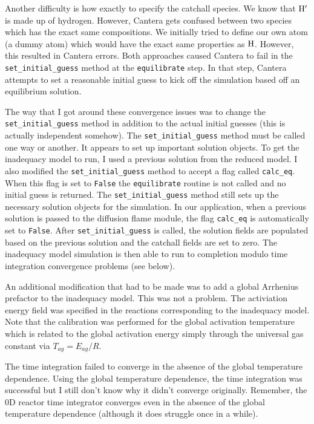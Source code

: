 Another difficulty is how exactly to specify the catchall species.  We know that $\ce{H}^{\prime}$ 
is made up of hydrogen.  However, Cantera gets confused between two species which has the exact 
same compositions.  We initially tried to define our own atom (a dummy atom) which would have
the exact same properties as $\ce{H}$.  However, this resulted in Cantera errors.  Both
approaches caused Cantera to fail in the \texttt{set\_initial\_guess} method at the \texttt{equilibrate} 
step.  In that step, Cantera attempts to set a reasonable initial guess to kick off the simulation 
based off an equilibrium solution. 

The way that I got around these convergence issues was to change the \texttt{set\_initial\_guess} 
method in addition to the actual initial guesses (this is actually independent somehow).  
The \texttt{set\_initial\_guess} method must be called one way or another.  It appears to 
set up important solution objects.  To get the inadequacy model to run, I used a previous 
solution from the reduced model.  I also modified the \texttt{set\_initial\_guess} method 
to accept a flag called \texttt{calc\_eq}.  When this flag is set to \texttt{False} the 
\texttt{equilibrate} routine is not called and no initial guess is returned.  The 
\texttt{set\_initial\_guess} method still sets up the necessary solution objects for the 
simulation.  In our application, when a previous solution is passed to the diffusion flame
module, the flag \texttt{calc\_eq} is automatically set to \texttt{False}.  After 
\texttt{set\_initial\_guess} is called, the solution fields are populated based on the 
previous solution and the catchall fields are set to zero.  The inadequacy model 
simulation is then able to run to completion modulo time integration convergence 
problems (see below). 

An additional modification that had to be made was to add a global Arrhenius 
prefactor to the inadequacy model.  This was not a problem.  The activiation 
energy field was specified in the reactions corresponding to the inadequacy 
model.  Note that the calibration was performed for the global activation 
temperature which is related to the global activation energy simply through 
the universal gas constant via $T_{ag} = E_{ag} / R$. 

The time integration failed to converge in the absence of the global 
temperature dependence.  Using the global temperature dependence, the time 
integration was successful but I still don't know why it didn't converge 
originally.  Remember, the 0D reactor time integrator converges even in 
the absence of the global temperature dependence (although it does struggle 
once in a while).

